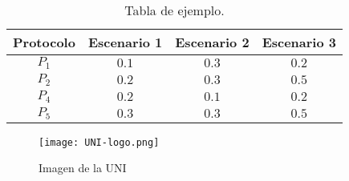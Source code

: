 \documentclass[10pt,conference, twoside,a4paper]{IEEEtran}
\begin{document}
\begin{table}[H]
\centering
\caption{Tabla de ejemplo.}
\label{tab:tabla}
\begin{tabular}{c c c c}
\hline
\hline
 Protocolo & Escenario 1 & Escenario 2 & Escenario 3 \\
\hline
 $P_1$ & $0.1$ & $0.3$ & $0.2$ \\
 $P_2$ & $0.2$ & $0.3$ & $0.5$ \\
 $P_4$ & $0.2$ & $0.1$ & $0.2$ \\
 $P_5$ & $0.3$ & $0.3$ & $0.5$ \\
\hline
\hline
\end{tabular}
\end{table}

\begin{figure}[H]
\centerline{
\texttt{[image: UNI-logo.png]}
}
\caption{Imagen de la UNI}
\label{fig:protocols}
\end{figure}
\end{document}
